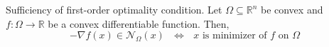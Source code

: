 
\begin{theorem}[L4.2]{Sufficiency of first-order optimality condition.}
    Let $\Omega \subseteq \mathbb{R}^n$ be convex and $f: \Omega \rightarrow \mathbb{R}$ be a convex differentiable function. Then,
    \vspace{-4pt}\\
    \begin{equation*}
        -\nabla f(x) \in \mathcal{N}_{\Omega}(x) \text{ } \Leftrightarrow \text{ } \text{$x$ is minimizer of $f$ on $\Omega$}
    \end{equation*}
    \vspace{-7pt}
\end{theorem}

